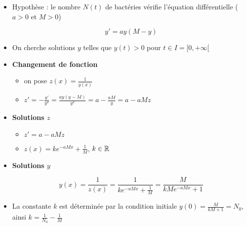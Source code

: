 \begin{frame}



\pause
\begin{itemize}
  \item Hypothèse : le nombre $N(t)$ de bactéries vérifie 
  l'équation différentielle ($a>0$ et $M>0$)

   \vspace*{-3ex}
\begin{equation}
  y' = ay(M - y)
  \label{eq:eqdiffverhulst}
  \tag{$E$}
\end{equation}

  \pause
  \item On cherche solutions $y$ telles que
$y(t)>0$ pour $t\in I = [0,+\infty[$
 
 \pause
  \item \textbf{Changement de fonction}
  \begin{itemize}
  \pause
    \item on pose $z(x) = \frac{1}{y(x)}$
    
    \pause
    \item $\displaystyle z'=-\frac{y'}{y^2} = \frac{ay(y-M)}{y^2} = a - \frac{aM}{y} = a-aMz$

  \end{itemize}
  
  \pause
  \item \textbf{Solutions $z$}
  \begin{itemize}
  \pause
    \item $z' = a-aMz$
    \pause
    \item $z(x) = k e^{-aMx} + \frac1M$, $k \in \mathbb{R}$
    
  \end{itemize}

\pause
  \item \textbf{Solutions $y$}

  \pause
  \vspace*{-2ex}
  $$y(x) = \frac{1}{z(x)} = \frac{1}{k e^{-aMx} + \frac1M} = \frac{M}{kM e^{-aMx}+1}$$
  
  \pause
  \item La constante $k$ est déterminée par la condition initiale 
  $y(0) = \frac{M}{kM+1}=N_0$, ainsi $k = \frac{1}{N_0}-\frac{1}{M}$
\end{itemize}  
\end{frame}


